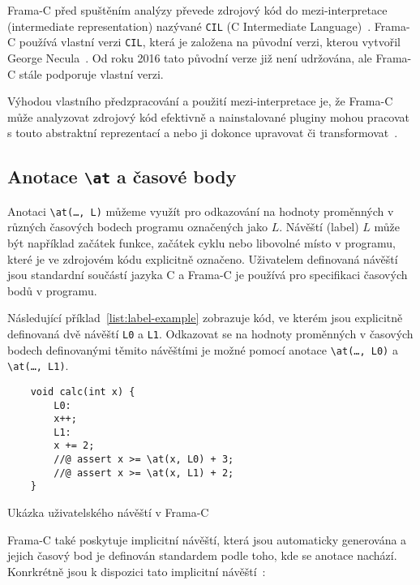 Frama\mbox{-}C před spuštěním analýzy převede zdrojový kód do mezi-interpretace (intermediate representation)
nazývané \texttt{CIL} (C Intermediate Language)~\cite{BlanchardACSL2024}.
Frama\mbox{-}C používá vlastní verzi \texttt{CIL}, která je založena na původní verzi, kterou vytvořil George Necula~\cite{Necula2002CIL}.
Od roku 2016 tato původní verze již není udržována, ale Frama\mbox{-}C stále podporuje vlastní verzi.

Výhodou vlastního předzpracování a použití mezi-interpretace je,
že Frama\mbox{-}C může analyzovat zdrojový kód efektivně
a nainstalované pluginy mohou pracovat s touto abstraktní reprezentací
a nebo ji dokonce upravovat či transformovat~\cite{FCKernelMaroneze2024}.


\subsection{Anotace \texttt{\textbackslash at} a časové body}
\label{subsec:anotace-at-a-casove-body}

Anotaci \texttt{\textbackslash at(\dots, L)} můžeme využít pro odkazování na hodnoty proměnných
v různých časových bodech programu označených jako $L$.
Návěští (label) $L$ může být například začátek funkce, začátek cyklu nebo libovolné místo v programu,
které je ve zdrojovém kódu explicitně označeno.
Uživatelem definovaná návěští jsou standardní součástí jazyka C
a Frama\mbox{-}C je používá pro specifikaci časových bodů v programu.

Následující příklad~\ref{list:label-example} zobrazuje kód,
ve kterém jsou explicitně definovaná dvě návěští \texttt{L0} a \texttt{L1}.
Odkazovat se na hodnoty proměnných v časových bodech definovanými těmito návěštími
je možné pomocí anotace \texttt{\textbackslash at(\dots, L0)} a \texttt{\textbackslash at(\dots, L1)}.

\begin{listing}[H]
    \begin{verbatim}
    void calc(int x) {
        L0:
        x++;
        L1:
        x += 2;
        //@ assert x >= \at(x, L0) + 3;
        //@ assert x >= \at(x, L1) + 2;
    }
    \end{verbatim}
    \caption{Ukázka uživatelského návěští v Frama-C}
    \label{list:label-example}
\end{listing}

Frama\mbox{-}C také poskytuje implicitní návěští,
která jsou automaticky generována a jejich časový bod je definován
standardem podle toho, kde se anotace nachází.
Konrkrétně jsou k dispozici tato implicitní návěští~\cite{ACSLSpec}:

